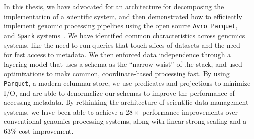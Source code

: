 \documentclass[masters]{ucbthesis}
\begin{document}
In this thesis, we have advocated for an architecture for decomposing the implementation of a scientific
system, and then demonstrated how to efficiently implement genomic processing pipelines using
the open source \texttt{Avro}, \texttt{Parquet}, and \texttt{Spark} systems~\cite{avro, parquet, zaharia10}. We have identified common
characteristics across genomics systems, like the need to run queries that touch slices of datasets and the need
for fast access to metadata. We then enforced data independence through a layering model that uses a schema
as the ``narrow waist'' of the stack, and used optimizations to make common, coordinate-based processing
fast. By using \texttt{Parquet}, a modern columnar store, we use predicates and projections to minimize I/O, and are able
to denormalize our schemas to improve the performance of accessing metadata.
By rethinking the architecture of scientific data management systems, we have been able to achieve
a $28\times$ performance improvements over conventional genomics processing systems, along with linear
strong scaling and a 63\% cost improvement.

\balance

\appendix



\end{document}
